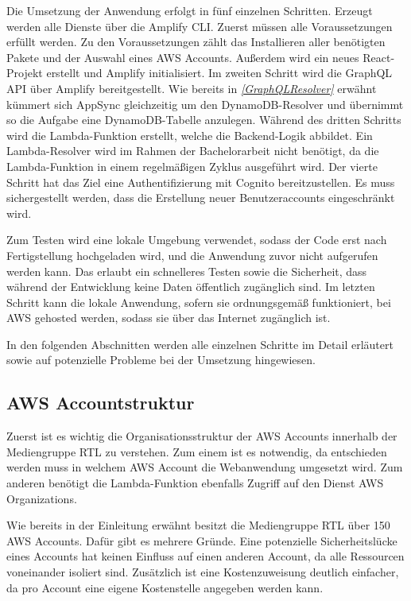 Die Umsetzung der Anwendung erfolgt in fünf einzelnen Schritten.
Erzeugt werden alle Dienste über die Amplify CLI.
Zuerst müssen alle Voraussetzungen erfüllt werden.
Zu den Voraussetzungen zählt das Installieren aller benötigten Pakete und der Auswahl eines AWS Accounts.
Außerdem wird ein neues React-Projekt erstellt und Amplify initialisiert.
Im zweiten Schritt wird die GraphQL API über Amplify bereitgestellt.
Wie bereits in \textit{\ref{GraphQLResolver} } erwähnt kümmert sich AppSync gleichzeitig um den DynamoDB-Resolver und übernimmt so die Aufgabe eine DynamoDB-Tabelle anzulegen.
Während des dritten Schritts wird die Lambda-Funktion erstellt, welche die Backend-Logik abbildet.
Ein Lambda-Resolver wird im Rahmen der Bachelorarbeit nicht benötigt, da die Lambda-Funktion in einem regelmäßigen Zyklus ausgeführt wird.
Der vierte Schritt hat das Ziel eine Authentifizierung mit Cognito bereitzustellen.
Es muss sichergestellt werden, dass die Erstellung neuer Benutzeraccounts eingeschränkt wird.

Zum Testen wird eine lokale Umgebung verwendet, sodass der Code erst nach Fertigstellung hochgeladen wird, und die Anwendung zuvor nicht aufgerufen werden kann.
Das erlaubt ein schnelleres Testen sowie die Sicherheit, dass während der Entwicklung keine Daten öffentlich zugänglich sind.
Im letzten Schritt kann die lokale Anwendung, sofern sie ordnungsgemäß funktioniert, bei AWS gehosted werden, sodass sie über das Internet zugänglich ist.


In den folgenden Abschnitten werden alle einzelnen Schritte im Detail erläutert sowie auf potenzielle Probleme bei der Umsetzung hingewiesen.

\subsection{AWS Accountstruktur }
\label{Accountstruktur}

Zuerst ist es wichtig die Organisationsstruktur der AWS Accounts innerhalb der Mediengruppe RTL zu verstehen.
Zum einem ist es notwendig, da entschieden werden muss in welchem AWS Account die Webanwendung umgesetzt wird.
Zum anderen benötigt die Lambda-Funktion ebenfalls Zugriff auf den Dienst AWS Organizations.

Wie bereits in der Einleitung erwähnt besitzt die Mediengruppe RTL über 150 AWS Accounts.
Dafür gibt es mehrere Gründe.
Eine potenzielle Sicherheitslücke eines Accounts hat keinen Einfluss auf einen anderen Account, da alle Ressourcen voneinander isoliert sind.
Zusätzlich ist eine Kostenzuweisung deutlich einfacher, da pro Account eine eigene Kostenstelle angegeben werden kann.

